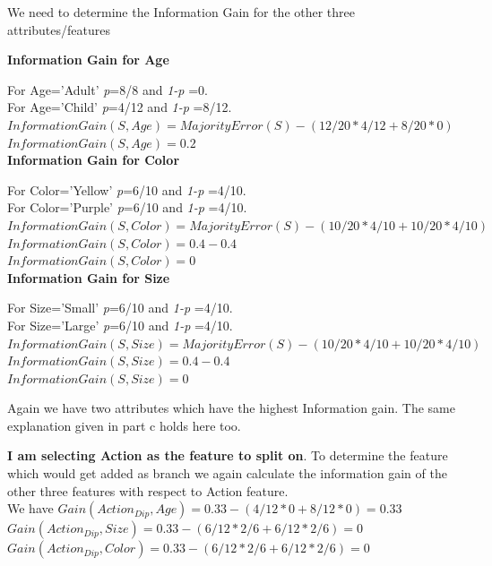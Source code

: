 \documentclass[11pt]{article}
\begin{document}
\begin{enumerate}
\begin{enumerate}
			We need to determine the Information Gain for the other three attributes/features
			
			\textbf{Information Gain for Age}
			
			For Age='Adult' \emph{p}=8/8  and \emph{1-p} =0. \\ 
			For Age='Child' \emph{p}=4/12  and \emph{1-p} =8/12. \\ 
			
			$Information Gain(S, Age)= MajorityError(S) - (12/20 *4/12  + 8/20 *0)$\\	
			$\boxed{Information Gain(S, Age)=0.2}$\\
			
			\textbf{Information Gain for Color}
			
			For Color='Yellow' \emph{p}=6/10  and \emph{1-p} =4/10. \\ 
			For Color='Purple' \emph{p}=6/10  and \emph{1-p} =4/10. \\ 
			
			$Information Gain(S, Color)= MajorityError(S) - (10/20 *4/10  + 10/20 *4/10)$\\	
			${Information Gain(S, Color)=0.4-0.4}$\\
			$\boxed{Information Gain(S, Color)=0}$\\
			
			\textbf{Information Gain for Size}
			
			For Size='Small' \emph{p}=6/10  and \emph{1-p} =4/10. \\ 
			For Size='Large' \emph{p}=6/10  and \emph{1-p} =4/10. \\ 
			
			$Information Gain(S, Size)= MajorityError(S) - (10/20 *4/10  + 10/20 *4/10)$\\	
			${Information Gain(S, Size)=0.4-0.4}$\\
			$\boxed{Information Gain(S, Size)=0}$\
			
			Again we have two attributes which have the highest Information gain. The same explanation given in part c holds here too.
			
			\textbf{ I am selecting Action as the feature to split on}. To determine the feature which would get added as branch we again calculate the information gain of the other three features with respect to Action feature.\\
			
			We have 
			$Gain(Action_{Dip}, Age)= 0.33 - (4/12 * 0 +8/12 * 0)= 0.33$\\
			$Gain(Action_{Dip}, Size)= 0.33 - (6/12 *2/6   +6/12 * 2/6 )= 0$\\
			$Gain(Action_{Dip}, Color)= 0.33 - (6/12 *2/6   +6/12 * 2/6 )= 0$\\
			

\end{enumerate}
\end{enumerate}
\end{document}
